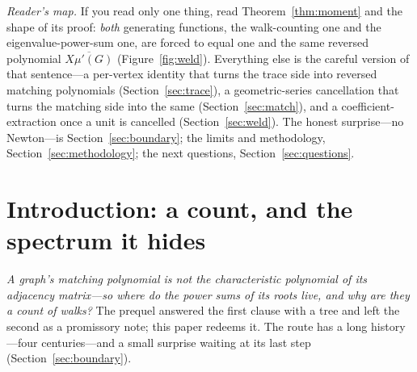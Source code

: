 \documentclass[11pt]{article}
\begin{document}
\noindent\emph{Reader's map.} If you read only one thing, read Theorem~\ref{thm:moment} and the shape
of its proof: \emph{both} generating functions, the walk-counting one and the eigenvalue-power-sum
one, are forced to equal one and the same reversed polynomial $\overline{X\mu'(G)}$
(Figure~\ref{fig:weld}). Everything else is the careful version of that sentence---a per-vertex
identity that turns the trace side into reversed matching polynomials (Section~\ref{sec:trace}), a
geometric-series cancellation that turns the matching side into the same (Section~\ref{sec:match}),
and a coefficient-extraction once a unit is cancelled (Section~\ref{sec:weld}). The honest
surprise---no Newton---is Section~\ref{sec:boundary}; the limits and methodology,
Section~\ref{sec:methodology}; the next questions, Section~\ref{sec:questions}.

\section{Introduction: a count, and the spectrum it hides}
\label{sec:intro}

\emph{A graph's matching polynomial is not the characteristic polynomial of its adjacency matrix---so
where do the power sums of its roots live, and why are they a count of walks?} The prequel answered the first
clause with a tree and left the second as a promissory note; this paper redeems it. The route has a
long history---four centuries---and a small surprise waiting at its last step
(Section~\ref{sec:boundary}).
\end{document}
